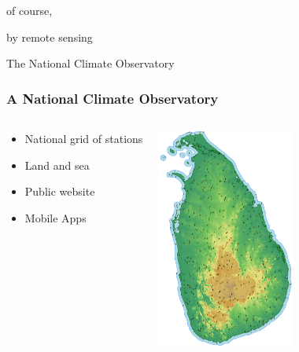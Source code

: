 \documentclass[serif,mathserif]{beamer}
\begin{document}

\begin{frame}
  \centering
 {of course,}
  
\end{frame}


\begin{frame}
  \centering
{by remote sensing}
  
\end{frame}



{
\begin{frame}[plain] %
\begin{shaded}
The National Climate Observatory
\end{shaded}
\end{frame}}


\begin{frame}
  \frametitle{A National Climate Observatory}
\begin{columns}
\begin{center}
\begin{itemize}
 \item National grid of stations
 \item Land and sea
 \item Public website
 \item Mobile Apps
\end{itemize}
\end{center}

\begin{center}
 \includegraphics[width=4.5cm]{ws500.png}
\end{center}
\end{columns}
\end{frame}
\end{document}
